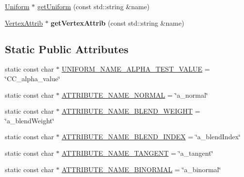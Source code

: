 \textbf{ }\par
\begin{DoxyCompactItemize}
\item 
\hyperlink{structUniform}{Uniform} $\ast$ \hyperlink{classGLProgram_a124306134c72cd3f3f3ea1f5a9e9a7e4}{get\+Uniform} (const std\+::string \&name)
\item 
\mbox{\label{classGLProgram_aff60bbf0987d7683e6c4c907355f2629}} 
\hyperlink{structVertexAttrib}{Vertex\+Attrib} $\ast$ {\bfseries get\+Vertex\+Attrib} (const std\+::string \&name)
\end{DoxyCompactItemize}

\subsection*{Static Public Attributes}
\begin{DoxyCompactItemize}
\item 
static const char $\ast$ \hyperlink{classGLProgram_a1d75496e86f468b6c14a073cb61e5128}{U\+N\+I\+F\+O\+R\+M\+\_\+\+N\+A\+M\+E\+\_\+\+A\+L\+P\+H\+A\+\_\+\+T\+E\+S\+T\+\_\+\+V\+A\+L\+UE} = \char`\"{}C\+C\+\_\+alpha\+\_\+value\char`\"{}
\item 
static const char $\ast$ \hyperlink{classGLProgram_a02c4527908f3d4cf3177545b38f8fcb4}{A\+T\+T\+R\+I\+B\+U\+T\+E\+\_\+\+N\+A\+M\+E\+\_\+\+N\+O\+R\+M\+AL} = \char`\"{}a\+\_\+normal\char`\"{}
\item 
static const char $\ast$ \hyperlink{classGLProgram_ae293f962f7c7d98070cbb6b8859ff043}{A\+T\+T\+R\+I\+B\+U\+T\+E\+\_\+\+N\+A\+M\+E\+\_\+\+B\+L\+E\+N\+D\+\_\+\+W\+E\+I\+G\+HT} = \char`\"{}a\+\_\+blend\+Weight\char`\"{}
\item 
static const char $\ast$ \hyperlink{classGLProgram_a49c39f3b0e57ca8955e5c6925b653908}{A\+T\+T\+R\+I\+B\+U\+T\+E\+\_\+\+N\+A\+M\+E\+\_\+\+B\+L\+E\+N\+D\+\_\+\+I\+N\+D\+EX} = \char`\"{}a\+\_\+blend\+Index\char`\"{}
\item 
static const char $\ast$ \hyperlink{classGLProgram_a475a6525706ccc570d14aa8e9009c1c4}{A\+T\+T\+R\+I\+B\+U\+T\+E\+\_\+\+N\+A\+M\+E\+\_\+\+T\+A\+N\+G\+E\+NT} = \char`\"{}a\+\_\+tangent\char`\"{}
\item 
static const char $\ast$ \hyperlink{classGLProgram_af86dd4dc412c66a10bf8c084077490b2}{A\+T\+T\+R\+I\+B\+U\+T\+E\+\_\+\+N\+A\+M\+E\+\_\+\+B\+I\+N\+O\+R\+M\+AL} = \char`\"{}a\+\_\+binormal\char`\"{}
\end{DoxyCompactItemize}
